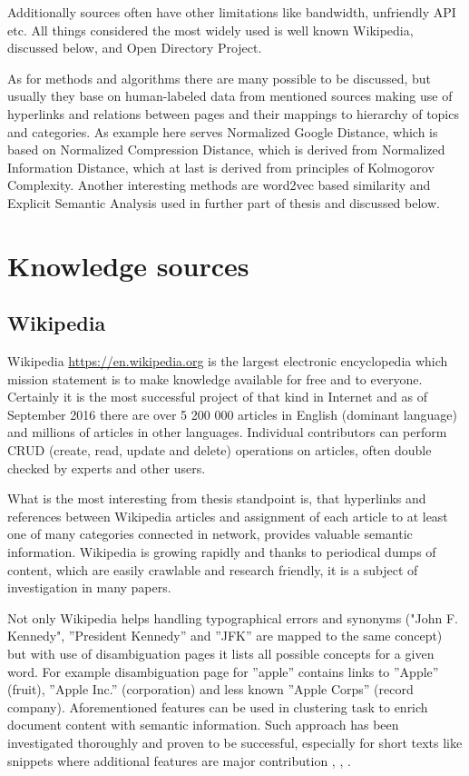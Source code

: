 \documentclass[a4paper, 12pt, oneside]{Thesis} %
\begin{document}
Additionally sources often have other limitations like bandwidth, unfriendly API etc. All things considered the most widely used is well known Wikipedia, discussed below, and Open Directory Project. 

As for methods and algorithms there are many possible to be discussed, but usually they base on human-labeled data from mentioned sources making use of hyperlinks and relations between pages and their mappings to hierarchy of topics and categories. As example here serves Normalized Google Distance, which is based on Normalized Compression Distance, which is derived from Normalized Information Distance, which at last is derived from principles of Kolmogorov Complexity. 
Another interesting methods are word2vec based similarity and Explicit Semantic Analysis used in further part of thesis and discussed below.

\section{Knowledge sources} 

\subsection{Wikipedia} Wikipedia \url{https://en.wikipedia.org} is the largest electronic encyclopedia which mission statement is to make knowledge available for free and to everyone. Certainly it is the most successful project of that kind in Internet and as of September 2016 there are over 5 200 000 articles in English (dominant language) and millions of articles in other languages. Individual contributors can perform CRUD (create, read, update and delete) operations on articles, often double checked by experts and other users.

What is the most interesting from thesis standpoint is, that hyperlinks and references between Wikipedia articles and assignment of each article to at least one of many categories connected in network, provides valuable semantic information. Wikipedia is growing rapidly and thanks to periodical dumps of content, which are easily crawlable and research friendly, it is a subject of investigation in many papers. 

Not only Wikipedia helps handling typographical errors and synonyms ("John F. Kennedy", ”President Kennedy” and ”JFK” are mapped to the same concept) but with use of disambiguation pages it lists all possible concepts for a given word. For example disambiguation page for ”apple” contains links to ”Apple” (fruit), ”Apple Inc.” (corporation) and less known ”Apple Corps” (record company). Aforementioned features can be used in clustering task to enrich document content with semantic information. Such approach has been investigated thoroughly and proven to be successful, especially for short texts like snippets where additional features are major contribution \cite{banerjee2007clustering}, \cite{hu2008enhancing}, \cite{gabrilovich2005feature}.
\end{document}
